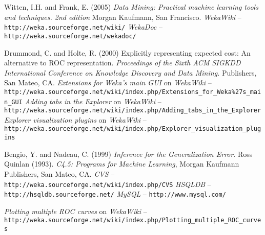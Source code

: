 
\begin{thebibliography}{999}

		Witten, I.H. and Frank, E. (2005) \textit{Data Mining: Practical machine
		learning tools and techniques. 2nd edition}  Morgan Kaufmann, San
		Francisco.
		\textit{WekaWiki} -- \texttt{http://weka.sourceforge.net/wiki/}
		\textit{WekaDoc} -- \texttt{http://weka.sourceforge.net/wekadoc/}

		Drummond, C. and Holte, R. (2000) Explicitly representing expected cost: An alternative to ROC representation.
		\textit{Proceedings of the Sixth ACM SIGKDD International Conference on Knowledge Discovery and Data Mining.}
		Publishers, San Mateo, CA.
		\textit{Extensions for Weka's main GUI} on \textit{WekaWiki} -- \\
		\small{\texttt{http://weka.sourceforge.net/wiki/index.php/Extensions\_for\_Weka\%27s\_main\_GUI}}
		\textit{Adding tabs in the Explorer} on \textit{WekaWiki} -- \\
		\small{\texttt{http://weka.sourceforge.net/wiki/index.php/Adding\_tabs\_in\_the\_Explorer}}
		\textit{Explorer visualization plugins} on \textit{WekaWiki} -- \\
		\small{\texttt{http://weka.sourceforge.net/wiki/index.php/Explorer\_visualization\_plugins}}

		Bengio, Y. and Nadeau, C. (1999) \textit{Inference for the Generalization Error}.
		Ross Quinlan (1993). \textit{C4.5: Programs for Machine Learning}, Morgan Kaufmann Publishers, San Mateo, CA.
		\textit{CVS} -- \texttt{http://weka.sourceforge.net/wiki/index.php/CVS}
		\textit{HSQLDB} -- \texttt{http://hsqldb.sourceforge.net/}
		\textit{MySQL} -- \texttt{http://www.mysql.com/}

		\textit{Plotting multiple ROC curves} on \textit{WekaWiki} -- \\
		\small{\texttt{http://weka.sourceforge.net/wiki/index.php/Plotting\_multiple\_ROC\_curves}}


\end{thebibliography}
